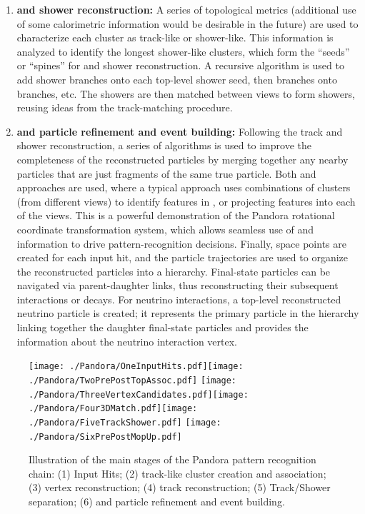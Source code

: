 \begin{enumerate}
\item{\bf \twod and \threed shower reconstruction:} A series of topological metrics (additional use of some calorimetric information would be desirable in the future) are used to characterize each \twod cluster as track-like or shower-like. This information is analyzed to identify the longest shower-like clusters, which form the ``seeds'' or ``spines'' for \twod and \threed shower reconstruction. A recursive algorithm is used to add shower branches onto each top-level shower seed, then branches onto branches, etc. The \twod showers are then matched between views to form \threed showers, reusing ideas from the \threed track-matching procedure.
\item{\bf \twod and \threed particle refinement and event building:} Following the \threed track and shower reconstruction, a series of algorithms is used to improve the completeness of the reconstructed particles by merging together any nearby particles that are just fragments of the same true particle. Both \twod and \threed approaches are used, %
where a typical approach uses combinations of \twod clusters (from different views) to identify features in \threed, or projecting \threed features into each of the \twod views. This is a powerful demonstration of the Pandora rotational coordinate transformation system, which allows seamless use of \twod and \threed information to drive pattern-recognition decisions. Finally, \threed space points are created for each \twod input hit, and the \threed particle trajectories are used to organize the reconstructed particles into a hierarchy. Final-state particles can be navigated via parent-daughter links, thus reconstructing their subsequent interactions or decays. For neutrino interactions, a top-level reconstructed neutrino particle is created; it represents the primary particle in the hierarchy linking together the daughter final-state particles and provides the information about the neutrino interaction vertex.

\end{enumerate}

\begin{figure}[!h!tbp]
\centering
\texttt{[image: ./Pandora/OneInputHits.pdf]}\texttt{[image: ./Pandora/TwoPrePostTopAssoc.pdf]}
\texttt{[image: ./Pandora/ThreeVertexCandidates.pdf]}\texttt{[image: ./Pandora/Four3DMatch.pdf]}\texttt{[image: ./Pandora/FiveTrackShower.pdf]}
\texttt{[image: ./Pandora/SixPrePostMopUp.pdf]}
\caption{Illustration of the main stages of the Pandora pattern recognition chain: (1) Input Hits; (2) \twod track-like cluster creation and association; (3) \threed vertex reconstruction; (4) \threed track reconstruction; (5) Track/Shower separation; (6) \twod and \threed particle refinement and event building.}
\label{reco_steps}
\end{figure}

